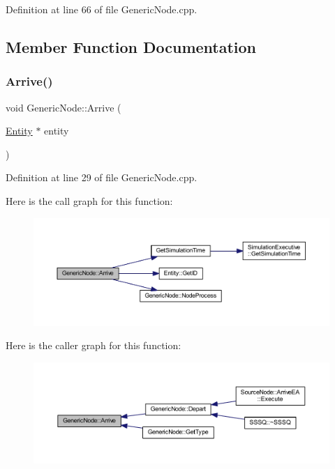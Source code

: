 Definition at line 66 of file Generic\+Node.\+cpp.



\subsection{Member Function Documentation}
\mbox{\label{class_generic_node_a923a359d019dc5a97a3da74aa33e2761}} 
\subsubsection{\texorpdfstring{Arrive()}{Arrive()}}
{\footnotesize\ttfamily void Generic\+Node\+::\+Arrive (\begin{DoxyParamCaption}\item[{\hyperlink{class_entity}{Entity} $\ast$}]{entity }\end{DoxyParamCaption})}



Definition at line 29 of file Generic\+Node.\+cpp.

Here is the call graph for this function\+:\nopagebreak
\begin{figure}[H]
\begin{center}
\leavevmode
\includegraphics[width=350pt]{class_generic_node_a923a359d019dc5a97a3da74aa33e2761_cgraph}
\end{center}
\end{figure}
Here is the caller graph for this function\+:
\nopagebreak
\begin{figure}[H]
\begin{center}
\leavevmode
\includegraphics[width=350pt]{class_generic_node_a923a359d019dc5a97a3da74aa33e2761_icgraph}
\end{center}
\end{figure}
\mbox{\label{class_generic_node_a2d573208cd3bc049c7068a331c6cd294}} 
